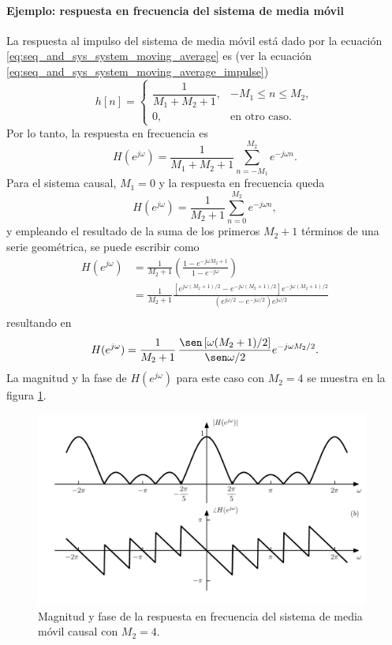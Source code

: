 \documentclass[a4paper]{report}
\begin{document}
\paragraph{Ejemplo: respuesta en frecuencia del sistema de media móvil} La respuesta al impulso del sistema de media móvil está dado por la ecuación \ref{eq:seq_and_sys_system_moving_average} es (ver la ecuación \ref{eq:seq_and_sys_system_moving_average_impulse})
\[
 h[n]=
 \left\{ 
 \begin{array}{ll}
  \dfrac{1}{M_1+M_2+1}, & -M_1\leq n\leq M_2,\\
  0, & \textrm{en otro caso.}
 \end{array}
 \right.
\]
Por lo tanto, la respuesta en frecuencia es
\[
 H(e^{j\omega})=\frac{1}{M_1+M_2+1}\sum_{n=-M_1}^{M_2}e^{-j\omega n}.
\]
Para el sistema causal, \(M_1=0\) y la respuesta en frecuencia queda
\[
 H(e^{j\omega})=\frac{1}{M_2+1}\sum_{n=0}^{M_2}e^{-j\omega n},
\]
y empleando el resultado de la suma de los primeros \(M_2+1\) términos de una serie geométrica, se puede escribir como
\begin{align*}
 H(e^{j\omega})&=\frac{1}{M_2+1}\left(\frac{1-e^{-j\omega M_2+1}}{1-e^{-j\omega}}\right)\\
  &=\frac{1}{M_2+1}\frac{\left[e^{j\omega(M_2+1)/2}-e^{-j\omega(M_2+1)/2}\right]e^{-j\omega(M_2+1)/2}}{\left(e^{j\omega/2}-e^{-j\omega/2}\right)e^{j\omega/2}}\\
\end{align*}
resultando en
\begin{equation}\label{eq:seq_and_sys_system_moving_average_causal_freq_response}
 H(e^{j\omega})=\frac{1}{M_2+1}\,\frac{\sen\left[\omega(M_2+1)/2\right]}{\sen\omega/2}e^{-j\omega M_2/2}. 
\end{equation}
La magnitud y la fase de \(H(e^{j\omega})\) para este caso con \(M_2=4\) se muestra en la figura \ref{fig:example_02_16_moving_average_freq_response}.
\begin{figure}[!htb]
 \begin{center}
 \includegraphics[width=0.98\textwidth]{figuras/example_02_16_moving_average_freq_response.pdf}
 \caption{\label{fig:example_02_16_moving_average_freq_response} Magnitud y fase de la respuesta en frecuencia del sistema de media móvil causal con \(M_2=4\).}
 \end{center}
\end{figure}
\end{document}
